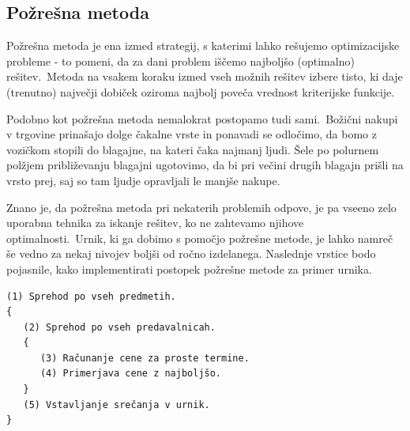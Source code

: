 \documentclass[a4paper,10pt]{article}
\begin{document}
\subsection{Požrešna metoda}

Požrešna metoda je ena izmed strategij, s katerimi lahko rešujemo optimizacijske probleme -
to pomeni, da za dani problem iščemo najboljšo (optimalno) rešitev.\ Metoda na vsakem koraku
izmed vseh možnih rešitev izbere  tisto, ki daje (trenutno) največji dobiček oziroma najbolj
poveča vrednost kriterijske funkcije.

Podobno kot požrešna metoda nemalokrat postopamo tudi sami.\ Božični nakupi v trgovine
prinašajo dolge čakalne vrste in ponavadi se odločimo, da bomo z vozičkom stopili do blagajne,
na kateri čaka najmanj ljudi. Šele po polurnem polžjem približevanju blagajni ugotovimo,
da bi pri večini drugih blagajn prišli na vrsto prej, saj so tam ljudje opravljali le
manjše nakupe.

Znano je, da požrešna metoda pri nekaterih problemih odpove, je pa vseeno zelo uporabna
tehnika za iskanje rešitev, ko ne zahtevamo njihove optimalnosti.\ Urnik, ki ga dobimo s
pomočjo požrešne metode, je lahko namreč še vedno za nekaj nivojev boljši od ročno izdelanega.
Naslednje vrstice bodo pojasnile, kako implementirati postopek požrešne metode za primer urnika.

\begin{verbatim}
(1) Sprehod po vseh predmetih.
{
   (2) Sprehod po vseh predavalnicah.
   {
      (3) Računanje cene za proste termine.
      (4) Primerjava cene z najboljšo.
   }
   (5) Vstavljanje srečanja v urnik.
}
\end{verbatim}
\end{document}
